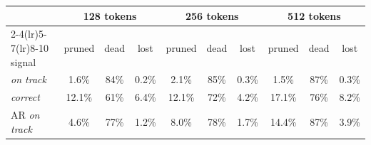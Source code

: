 \begin{tabular}{@{}lccccccccc@{}}
\toprule
 & \multicolumn{3}{c}{128 tokens} & \multicolumn{3}{c}{256 tokens} & \multicolumn{3}{c}{512 tokens} \\ \cmidrule(lr){2-4}\cmidrule(lr){5-7}\cmidrule(lr){8-10}
signal & pruned & dead & lost & pruned & dead & lost & pruned & dead & lost \\ \midrule
\kev{} \emph{on track} & 1.6\% & 84\% & 0.2\% & 2.1\% & 85\% & 0.3\% & 1.5\% & 87\% & 0.3\% \\
\kev{} \emph{correct} & 12.1\% & 61\% & 6.4\% & 12.1\% & 72\% & 4.2\% & 17.1\% & 76\% & 8.2\% \\
AR \emph{on track} & 4.6\% & 77\% & 1.2\% & 8.0\% & 78\% & 1.7\% & 14.4\% & 87\% & 3.9\% \\
\bottomrule
\end{tabular}
